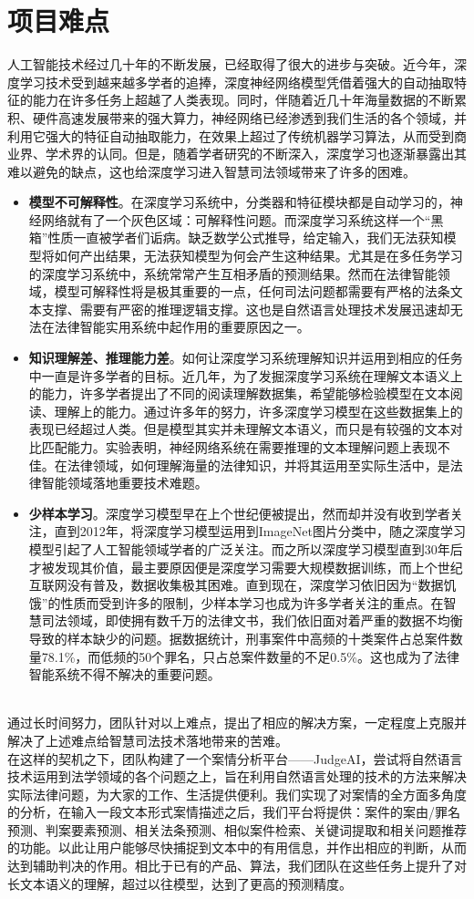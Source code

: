 \section{项目难点}
人工智能技术经过几十年的不断发展，已经取得了很大的进步与突破。近今年，深度学习技术受到越来越多学者的追捧，深度神经网络模型凭借着强大的自动抽取特征的能力在许多任务上超越了人类表现。同时，伴随着近几十年海量数据的不断累积、硬件高速发展带来的强大算力，神经网络已经渗透到我们生活的各个领域，并利用它强大的特征自动抽取能力，在效果上超过了传统机器学习算法，从而受到商业界、学术界的认同。但是，随着学者研究的不断深入，深度学习也逐渐暴露出其难以避免的缺点，这也给深度学习进入智慧司法领域带来了许多的困难。
\begin{itemize}
	\item \textbf{模型不可解释性}。在深度学习系统中，分类器和特征模块都是自动学习的，神经网络就有了一个灰色区域：可解释性问题。而深度学习系统这样一个“黑箱”性质一直被学者们诟病。缺乏数学公式推导，给定输入，我们无法获知模型将如何产出结果，无法获知模型为何会产生这种结果。尤其是在多任务学习的深度学习系统中，系统常常产生互相矛盾的预测结果。然而在法律智能领域，模型可解释性将是极其重要的一点，任何司法问题都需要有严格的法条文本支撑、需要有严密的推理逻辑支撑。这也是自然语言处理技术发展迅速却无法在法律智能实用系统中起作用的重要原因之一。
	
	\item \textbf{知识理解差、推理能力差}。如何让深度学习系统理解知识并运用到相应的任务中一直是许多学者的目标。近几年，为了发掘深度学习系统在理解文本语义上的能力，许多学者提出了不同的阅读理解数据集\cite{nguyen2016ms,rajpurkar2016squad,trischler2016newsqa}，希望能够检验模型在文本阅读、理解上的能力。通过许多年的努力，许多深度学习模型在这些数据集上的表现已经超过人类。但是模型其实并未理解文本语义，而只是有较强的文本对比匹配能力\cite{clark2018think}。\citet{kwiatkowski2019natural}实验表明，神经网络系统在需要推理的文本理解问题上表现不佳。在法律领域，如何理解海量的法律知识，并将其运用至实际生活中，是法律智能领域落地重要技术难题。
	
	\item \textbf{少样本学习}。深度学习模型早在上个世纪便被提出，然而却并没有收到学者关注，直到2012年，\citet{krizhevsky2012imagenet}将深度学习模型运用到ImageNet图片分类中，随之深度学习模型引起了人工智能领域学者的广泛关注。而之所以深度学习模型直到30年后才被发现其价值，最主要原因便是深度学习需要大规模数据训练，而上个世纪互联网没有普及，数据收集极其困难。直到现在，深度学习依旧因为“数据饥饿”的性质而受到许多的限制，少样本学习也成为许多学者关注的重点。在智慧司法领域，即使拥有数千万的法律文书，我们依旧面对着严重的数据不均衡导致的样本缺少的问题。据数据统计，刑事案件中高频的十类案件占总案件数量78.1\%，而低频的50个罪名，只占总案件数量的不足0.5\%。这也成为了法律智能系统不得不解决的重要问题。
	
\end{itemize}
~\\
通过长时间努力，团队针对以上难点，提出了相应的解决方案，一定程度上克服并解决了上述难点给智慧司法技术落地带来的苦难。
\\

在这样的契机之下，团队构建了一个案情分析平台——JudgeAI，尝试将自然语言技术运用到法学领域的各个问题之上，旨在利用自然语言处理的技术的方法来解决实际法律问题，为大家的工作、生活提供便利。我们实现了对案情的全方面多角度的分析，在输入一段文本形式案情描述之后，我们平台将提供：案件的案由/罪名预测、判案要素预测、相关法条预测、相似案件检索、关键词提取和相关问题推荐的功能。以此让用户能够尽快捕捉到文本中的有用信息，并作出相应的判断，从而达到辅助判决的作用。相比于已有的产品、算法，我们团队在这些任务上提升了对长文本语义的理解，超过以往模型，达到了更高的预测精度。
